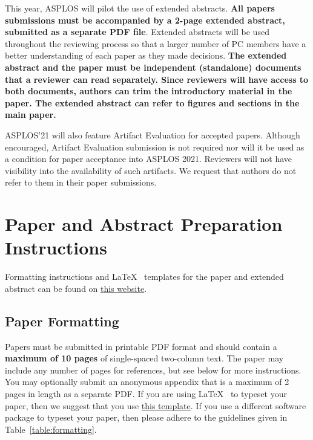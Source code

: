 \documentclass[pageno]{jpaper}
\begin{document}
This year, ASPLOS will pilot the use of extended abstracts. {\bf All
  papers submissions must be accompanied by a 2-page extended
  abstract, submitted as a separate PDF file}.  Extended abstracts
will be used throughout the reviewing process so that a larger number
of PC members have a better understanding of each paper as they made
decisions. {\bf The extended abstract and the paper must be independent (standalone) documents that a reviewer can read separately. Since reviewers will have access to both documents, authors can trim the introductory material in the paper. The extended abstract can refer to figures and sections in the main paper.}

ASPLOS'21 will also feature Artifact Evaluation for accepted papers. 
Although encouraged, Artifact Evaluation submission is not required nor will 
it be used as a condition for paper acceptance into ASPLOS 2021. Reviewers will 
not have visibility into the availability of such artifacts. We request that 
authors do not refer to them in their paper submissions.

\section{Paper and Abstract Preparation Instructions}

Formatting instructions and \LaTeX~ templates for the paper and
extended abstract can be found on
\href{https://asplos-conference.org/submissions/}{this website}.

\subsection{Paper Formatting}

Papers must be submitted in printable PDF format and should contain a
{\bf maximum of 10 pages} of single-spaced two-column text. The paper may include any number of pages for
references, but see below for more instructions. You may
optionally submit an anonymous appendix that is a maximum of 2 pages
in length  as a separate PDF.  If you are using
\LaTeX~\cite{lamport94} to typeset your paper, then we suggest that
you use \href{https://asplos-conference.org/wp-content/uploads/2020/06/asplos21-templates.zip}{this template}.
If you use a different
software package to typeset your paper, then please adhere to the
guidelines given in Table~\ref{table:formatting}.
\end{document}
